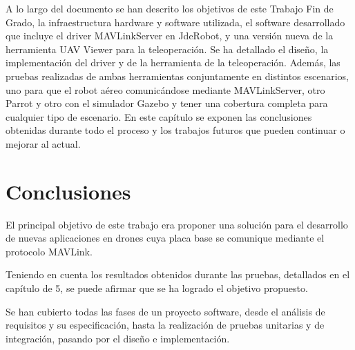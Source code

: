 A lo largo del documento se han descrito los objetivos de este Trabajo Fin de Grado, la infraestructura hardware y software utilizada, el software desarrollado que incluye el driver MAVLinkServer en JdeRobot, y una versión nueva de la herramienta UAV Viewer para la teleoperación. Se ha detallado el diseño, la implementación del driver y de la herramienta de la teleoperación. Además, las pruebas realizadas de ambas herramientas conjuntamente en distintos escenarios, uno para que el robot aéreo comunicándose mediante MAVLinkServer, otro Parrot y otro con el simulador Gazebo y tener una cobertura completa para cualquier tipo de escenario. En este capítulo se exponen las conclusiones obtenidas durante todo el proceso y los trabajos futuros que pueden continuar o mejorar al actual.

\section{Conclusiones}

El principal objetivo de este trabajo era proponer una solución para el desarrollo de nuevas aplicaciones en drones cuya placa base se comunique mediante el protocolo MAVLink. 

Teniendo en cuenta los resultados obtenidos durante las pruebas, detallados en el capítulo de 5, se puede afirmar que se ha logrado el objetivo propuesto. 

Se han cubierto todas las fases de un proyecto software, desde el análisis de requisitos y su especificación, hasta la realización de pruebas unitarias y de integración, pasando por el diseño e implementación. 

